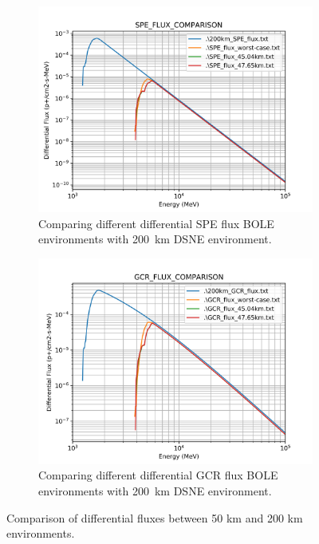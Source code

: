 \documentclass{hitec}
\begin{document}
\begin{figure}[htbp!]
	\centering
	\begin{subfigure}[b]{0.65\textwidth}
		\centering
		\includegraphics[width=\textwidth]{SPE_FLUX_COMPARISON.png}
		\caption{Comparing different differential SPE flux BOLE environments with 200~km DSNE environment.}
		\label{sfig:SPE_FLUX_COMPARISON}
	\end{subfigure}
	\hfill
	\begin{subfigure}[b]{0.65\textwidth}
		\centering
		\includegraphics[width=\textwidth]{GCR_FLUX_COMPARISON.png}
		\caption{Comparing different differential GCR flux BOLE environments with 200~km DSNE environment.}
		\label{sfig:GCR_FLUX_COMPARISON}
	\end{subfigure}
	\caption{Comparison of differential fluxes between 50 km and 200 km environments.}
	\label{fig:FLUX_COMPARISON}
\end{figure}
\end{document}
